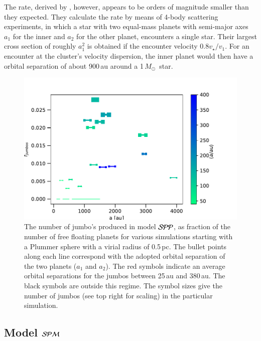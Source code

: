 \documentclass[aa]{lib/aa}
\newcommand{\MSun}{\mbox{${M}_\odot$}}
\begin{document}
The rate, derived by \citep{2023arXiv231006016W}, however, appears to
be orders of magnitude smaller than they expected.  They calculate the
rate by means of 4-body scattering experiments, in which a star with
two equal-mass planets with semi-major axes $a_1$ for the inner and
$a_2$ for the other planet, encounters a single star. Their largest
cross section of roughly $a_1^2$ is obtained if the encounter velocity
$0.8v_\star/v_1$. For an encounter at the cluster's velocity
dispersion, the inner planet would then have a orbital separation of
about 900\,au around a 1\,\MSun\, star.

\begin{figure}
    \centering
        \includegraphics[width=.91\columnwidth]{figures/fig_fjumbos_from_psystems.pdf}
        \caption{The number of jumbo's produced in model ${\cal SPP}$,
          as fraction of the number of free floating planets for
          various simulations starting with a Plummer sphere with a
          virial radius of 0.5\,pc.  The bullet points along each line
          correspond with the adopted orbital separation of the two
          planets ($a_1$ and $a_2$).  The red symbols indicate an
          average orbital separations for the jumbos between 25\,au
          and 380\,au.  The black symbols are outside this regime.
          The symbol sizes give the number of jumbos (see top right
          for scaling) in the particular simulation.  }
         \label{Fig:fjumbos_from_PP}
\end{figure}

\subsection{Model ${\cal SPM}$}
\end{document}
